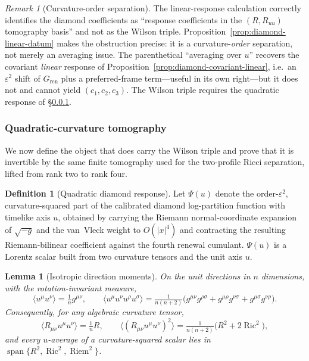 \documentclass[11pt]{article}
\newtheorem{lemma}[theorem]{Lemma}
\theoremstyle{definition}
\newtheorem{definition}[theorem]{Definition}
\theoremstyle{remark}
\newtheorem{remark}[theorem]{Remark}
\newcommand{\eps}{\varepsilon}
\newcommand{\Ric}{\operatorname{Ric}}
\newcommand{\Riem}{\operatorname{Riem}}
\newcommand{\Gren}{G_{\mathrm{ren}}}
\DeclareMathOperator{\spn}{span}
\begin{document}
\begin{remark}[Curvature-order separation]
\label{rem:gap-restated}
The linear-response calculation correctly identifies the diamond coefficients as
``response coefficients in the $(R,R_{uu})$ tomography basis'' and not as the Wilson
triple.  Proposition~\ref{prop:diamond-linear-datum} makes the obstruction precise: it is
a curvature-\emph{order} separation, not merely an averaging issue.  The parenthetical
``averaging over $u$'' recovers the covariant \emph{linear} response of
Proposition~\ref{prop:diamond-covariant-linear}, i.e.\ an $\eps^2$ shift of $\Gren$ plus a
preferred-frame term---useful in its own right---but it does not and cannot yield
$(c_1,c_2,c_3)$.  The Wilson triple requires the quadratic response of
\S\ref{subsec:u-tomography}.
\end{remark}

\subsubsection{Quadratic-curvature tomography}
\label{subsec:u-tomography}

We now define the object that does carry the Wilson triple and prove that it is
invertible by the same finite tomography used for the two-profile Ricci
separation, lifted from rank two to rank four.

\begin{definition}[Quadratic diamond response]
\label{def:quadratic-diamond-response}
Let $\Psi(u)$ denote the order-$\eps^2$, curvature-squared part of the calibrated
diamond log-partition function with timelike axis $u$, obtained by carrying the
Riemann normal-coordinate expansion of $\sqrt{-g}$ and the van~Vleck weight to
$O(|x|^4)$ and contracting the resulting Riemann-bilinear coefficient against the
fourth renewal cumulant.  $\Psi(u)$ is a Lorentz scalar built from two curvature
tensors and the unit axis $u$.
\end{definition}

\begin{lemma}[Isotropic direction moments]
\label{lem:diamond-iso-moments}
On the unit directions in $n$ dimensions, with the rotation-invariant measure,
\[
 \langle u^\mu u^\nu\rangle=\tfrac1n g^{\mu\nu},\qquad
 \langle u^\mu u^\nu u^\rho u^\sigma\rangle
 =\tfrac1{n(n+2)}\bigl(g^{\mu\nu}g^{\rho\sigma}
 +g^{\mu\rho}g^{\nu\sigma}+g^{\mu\sigma}g^{\nu\rho}\bigr).
\]
Consequently, for any algebraic curvature tensor,
\[
 \langle R_{\mu\nu}u^\mu u^\nu\rangle=\tfrac1n R,\qquad
 \langle (R_{\mu\nu}u^\mu u^\nu)^2\rangle
 =\tfrac1{n(n+2)}\bigl(R^2+2\Ric^2\bigr),
\]
and every $u$-average of a curvature-squared scalar lies in
$\spn\{R^2,\Ric^2,\Riem^2\}$.
\end{lemma}
\end{document}
